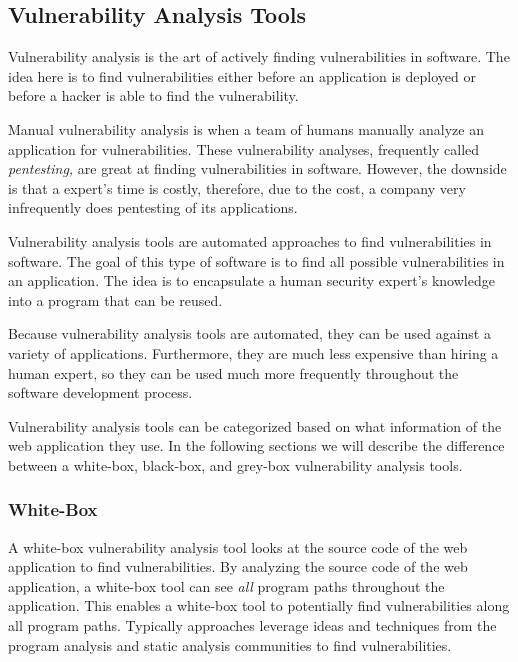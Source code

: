 
\subsection{Vulnerability Analysis Tools}

Vulnerability analysis is the art of actively finding vulnerabilities
in software. The idea here is to find vulnerabilities either before an
application is deployed or before a hacker is able to find the
vulnerability. 

Manual vulnerability analysis is when a team of humans manually
analyze an application for vulnerabilities. These vulnerability
analyses, frequently called \emph{pentesting,} are great at finding
vulnerabilities in software. However, the downside is that a expert's
time is costly, therefore, due to the cost, a company very
infrequently does pentesting of its applications.

Vulnerability analysis tools are automated approaches to find
vulnerabilities in software. The goal of this type of software is to
find all possible vulnerabilities in an application. The idea is to
encapsulate a human security expert's knowledge into a program that
can be reused. 

Because vulnerability analysis tools are automated, they can be used
against a variety of applications. Furthermore, they are much less
expensive than hiring a human expert, so they can be used much more
frequently throughout the software development process.

Vulnerability analysis tools can be categorized based on what
information of the web application they use. In the following
sections we will describe the difference between a white-box,
black-box, and grey-box vulnerability analysis tools. 

\subsubsection{White-Box}

A white-box vulnerability analysis tool looks at the source code of
the web application to find vulnerabilities. By analyzing the source
code of the web application, a white-box tool can see \emph{all}
program paths throughout the application. This enables a white-box
tool to potentially find vulnerabilities along all program paths.
Typically approaches leverage ideas and techniques from the program
analysis and static analysis communities to find vulnerabilities.


